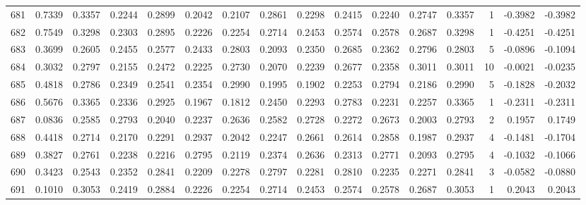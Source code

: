 \begin{tabular}{lrrrrrrrrrrrrrrr}
681 &      0.7339 &  0.3357 &  0.2244 &  0.2899 &  0.2042 &  0.2107 &  0.2861 &  0.2298 &  0.2415 &  0.2240 &   0.2747 &     0.3357 &      1 &                   -0.3982 &                    -0.3982 \\
682 &      0.7549 &  0.3298 &  0.2303 &  0.2895 &  0.2226 &  0.2254 &  0.2714 &  0.2453 &  0.2574 &  0.2578 &   0.2687 &     0.3298 &      1 &                   -0.4251 &                    -0.4251 \\
683 &      0.3699 &  0.2605 &  0.2455 &  0.2577 &  0.2433 &  0.2803 &  0.2093 &  0.2350 &  0.2685 &  0.2362 &   0.2796 &     0.2803 &      5 &                   -0.0896 &                    -0.1094 \\
684 &      0.3032 &  0.2797 &  0.2155 &  0.2472 &  0.2225 &  0.2730 &  0.2070 &  0.2239 &  0.2677 &  0.2358 &   0.3011 &     0.3011 &     10 &                   -0.0021 &                    -0.0235 \\
685 &      0.4818 &  0.2786 &  0.2349 &  0.2541 &  0.2354 &  0.2990 &  0.1995 &  0.1902 &  0.2253 &  0.2794 &   0.2186 &     0.2990 &      5 &                   -0.1828 &                    -0.2032 \\
686 &      0.5676 &  0.3365 &  0.2336 &  0.2925 &  0.1967 &  0.1812 &  0.2450 &  0.2293 &  0.2783 &  0.2231 &   0.2257 &     0.3365 &      1 &                   -0.2311 &                    -0.2311 \\
687 &      0.0836 &  0.2585 &  0.2793 &  0.2040 &  0.2237 &  0.2636 &  0.2582 &  0.2728 &  0.2272 &  0.2673 &   0.2003 &     0.2793 &      2 &                    0.1957 &                     0.1749 \\
688 &      0.4418 &  0.2714 &  0.2170 &  0.2291 &  0.2937 &  0.2042 &  0.2247 &  0.2661 &  0.2614 &  0.2858 &   0.1987 &     0.2937 &      4 &                   -0.1481 &                    -0.1704 \\
689 &      0.3827 &  0.2761 &  0.2238 &  0.2216 &  0.2795 &  0.2119 &  0.2374 &  0.2636 &  0.2313 &  0.2771 &   0.2093 &     0.2795 &      4 &                   -0.1032 &                    -0.1066 \\
690 &      0.3423 &  0.2543 &  0.2352 &  0.2841 &  0.2209 &  0.2278 &  0.2797 &  0.2281 &  0.2810 &  0.2235 &   0.2271 &     0.2841 &      3 &                   -0.0582 &                    -0.0880 \\
691 &      0.1010 &  0.3053 &  0.2419 &  0.2884 &  0.2226 &  0.2254 &  0.2714 &  0.2453 &  0.2574 &  0.2578 &   0.2687 &     0.3053 &      1 &                    0.2043 &                     0.2043 \\

\end{tabular}
